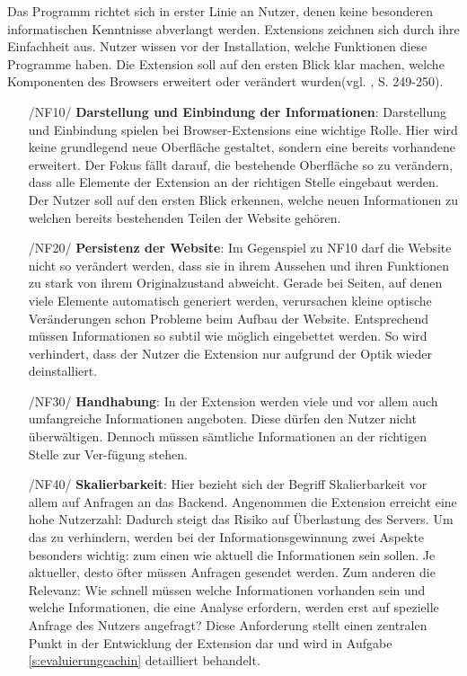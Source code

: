 Das Programm richtet sich in erster Linie an Nutzer, denen keine besonderen informatischen Kenntnisse abverlangt werden.
Extensions zeichnen sich durch ihre Einfachheit aus. Nutzer wissen vor der Installation, welche Funktionen diese Programme haben. Die Extension soll auf den ersten Blick klar machen, welche Komponenten des Browsers erweitert oder verändert wurden(vgl. \cite{eng2}, S. 249-250).


\begin{itemize}
	\item[/NF10/] \textbf{Darstellung und Einbindung der Informationen}:
	Darstellung und Einbindung spielen bei Browser-Extensions eine wichtige Rolle. Hier wird keine grundlegend neue Oberfläche gestaltet, sondern eine bereits vorhandene erweitert. Der Fokus fällt darauf, die bestehende Oberfläche so zu verändern, dass alle Elemente der Extension an der richtigen Stelle eingebaut werden. Der Nutzer soll auf den ersten Blick erkennen, welche neuen Informationen zu welchen bereits bestehenden Teilen der Website gehören.
	
	\item[/NF20/] \textbf{Persistenz der Website}:
	Im Gegenspiel zu NF10 darf die Website nicht so verändert werden, dass sie in ihrem Aussehen und ihren Funktionen zu stark von ihrem Originalzustand abweicht. Gerade bei Seiten, auf denen viele Elemente automatisch generiert werden, verursachen kleine optische Veränderungen schon Probleme beim Aufbau der Website. Entsprechend müssen Informationen so subtil wie möglich eingebettet werden. So wird verhindert, dass der Nutzer die Extension nur aufgrund der Optik wieder deinstalliert.
	
	\item[/NF30/] \textbf{Handhabung}:
	In der Extension werden viele und vor allem auch umfangreiche Informationen angeboten. Diese dürfen den Nutzer nicht überwältigen. Dennoch müssen sämtliche Informationen an der richtigen Stelle zur Ver-fügung stehen.
	
	\item[/NF40/] \textbf{Skalierbarkeit}:
	Hier bezieht sich der Begriff Skalierbarkeit vor allem auf Anfragen an das Backend. Angenommen die Extension erreicht eine hohe Nutzerzahl: Dadurch steigt das Risiko auf Überlastung des Servers. Um das zu verhindern, werden bei der Informationsgewinnung zwei Aspekte besonders wichtig: zum einen wie aktuell die Informationen sein sollen. Je aktueller, desto öfter müssen Anfragen gesendet werden. Zum anderen die Relevanz: Wie schnell müssen welche Informationen vorhanden sein und welche Informationen, die eine Analyse erfordern, werden erst auf spezielle Anfrage des Nutzers angefragt? Diese Anforderung stellt einen zentralen Punkt in der Entwicklung der Extension dar und wird in Aufgabe \ref{s:evaluierungcachin} detailliert behandelt.
	

\end{itemize}

